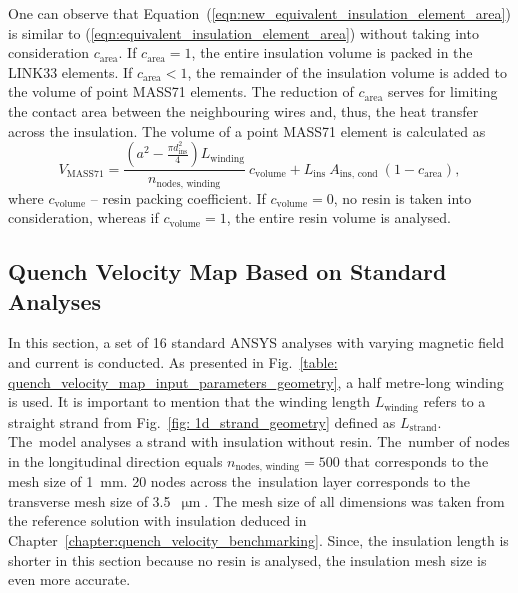 One can observe that Equation~(\ref{eqn:new_equivalent_insulation_element_area}) is similar to (\ref{eqn:equivalent_insulation_element_area}) without taking into consideration $c_\text{area}$. If $c_\text{area} = 1$, the entire insulation volume is packed in the LINK33 elements. If $c_\text{area} < 1$, the remainder of the insulation volume is added to the volume of point MASS71 elements. The reduction of $c_\text{area}$ serves for limiting the contact area between the neighbouring wires and, thus, the heat transfer across the insulation. The volume of a point MASS71 element is calculated as 
\begin{equation}
    V_\text{MASS71} = \frac{\left( a^2 - \frac{\pi d_\text{ins}^2}{4} \right) L_\text{winding}}{n_\text{nodes, winding}}~c_\text{volume} + L_\text{ins}~A_\text{ins, cond} ~ \left( 1-c_\text{area} \right),
    \label{eqn:mass71_volume_element}
\end{equation}
where $c_\text{volume}$ -- resin packing coefficient. If $c_\text{volume} = 0$, no resin is taken into consideration, whereas if $c_\text{volume} = 1$, the entire resin volume is analysed.

\subsection{Quench Velocity Map Based on Standard Analyses}

In this section, a set of 16 standard ANSYS analyses with varying magnetic field and current is conducted. As presented in Fig.~\ref{table: quench_velocity_map_input_parameters_geometry}, a half metre-long winding is used. It is important to mention that the winding length $L_\text{winding}$ refers to a straight strand from Fig.~\ref{fig: 1d_strand_geometry} defined as $L_\text{strand}$. The~model analyses a strand with insulation without resin. The~number of nodes in the longitudinal direction equals $n_\text{nodes, winding}=500$ that corresponds to the mesh size of 1~mm. 20 nodes across the~insulation layer corresponds to the transverse mesh size of 3.5~$\upmu \text{m}$. The mesh size of all dimensions was taken from the reference solution with insulation deduced in Chapter~\ref{chapter:quench_velocity_benchmarking}. Since, the insulation length is shorter in this section because no resin is analysed, the insulation mesh size is even more accurate. 

